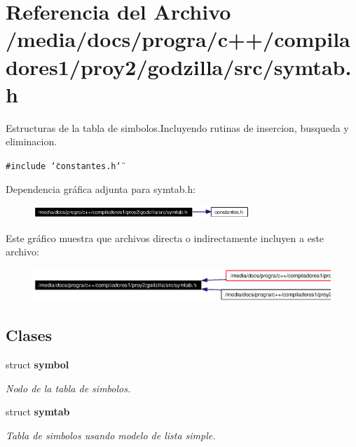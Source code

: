 \section{Referencia del Archivo /media/docs/progra/c++/compiladores1/proy2/godzilla/src/symtab.h}
\label{symtab_8h}
Estructuras de la tabla de simbolos.Incluyendo rutinas de insercion, busqueda y eliminacion. 

{\tt \#include \char`\"{}constantes.h\char`\"{}}\par


Dependencia gr\'{a}fica adjunta para symtab.h:\begin{figure}[H]
\begin{center}
\leavevmode
\includegraphics[width=231pt]{symtab_8h__incl}
\end{center}
\end{figure}


Este gr\'{a}fico muestra que archivos directa o indirectamente incluyen a este archivo:\begin{figure}[H]
\begin{center}
\leavevmode
\includegraphics[width=352pt]{symtab_8h__dep__incl}
\end{center}
\end{figure}
\subsection*{Clases}
\begin{CompactItemize}
\item 
struct {\bf symbol}
\begin{CompactList}\small\item\em Nodo de la tabla de simbolos. \item\end{CompactList}\item 
struct {\bf symtab}
\begin{CompactList}\small\item\em Tabla de simbolos usando modelo de lista simple. \item\end{CompactList}\end{CompactItemize}
